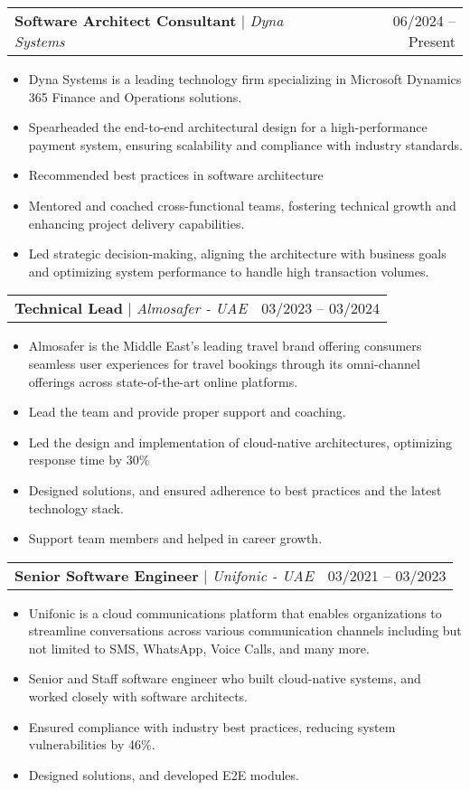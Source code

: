 \documentclass[letterpaper,11pt]{article}
\makeatletter
\newcommand{\resumeItem}[1]{
  \item\small{
    {#1 \vspace{-2pt}}
  }
}
\newcommand{\resumeProjectHeading}[2]{
    \item
    \begin{tabular*}{0.97\textwidth}{l@{\extracolsep{\fill}}r}
      \small#1 & #2 \\
    \end{tabular*}\vspace{-7pt}
}
\newcommand{\resumeItemListStart}{\begin{itemize}}
\newcommand{\resumeItemListEnd}{\end{itemize}\vspace{-5pt}}
\makeatother
\begin{document}
          \resumeProjectHeading
    		  {\textbf{Software Architect Consultant} $|$ \footnotesize\emph{Dyna Systems}\vspace{4pt}}{06/2024 -- Present}
    		  \resumeItemListStart
        		\resumeItem {Dyna Systems is a leading technology firm specializing in Microsoft Dynamics 365 Finance and Operations solutions.}
        		\resumeItem {Spearheaded the end-to-end architectural design for a high-performance payment system, ensuring scalability and compliance with industry standards.}
        		\resumeItem {Recommended best practices in software architecture}
        		\resumeItem {Mentored and coached cross-functional teams, fostering technical growth and enhancing project delivery capabilities.}
        	    \resumeItem {Led strategic decision-making, aligning the architecture with business goals and optimizing system performance to handle high transaction volumes.}
    		 \resumeItemListEnd



          \resumeProjectHeading
	          {\textbf{Technical Lead} $|$ \footnotesize\emph{Almosafer - UAE}\vspace{4pt}}{03/2023 -- 03/2024}
			\resumeItemListStart		  
          			\resumeItem {Almosafer is the Middle East’s leading travel brand offering consumers seamless user experiences for travel bookings through its omni-channel offerings across state-of-the-art online platforms.} 
          			\resumeItem {Lead the team and provide proper support and coaching.}
          			\resumeItem {Led the design and implementation of cloud-native architectures, optimizing response time by 30\%}
          			\resumeItem {Designed solutions, and ensured adherence to best practices and the latest technology stack.}
          			\resumeItem {Support team members and helped in career growth.}
          \resumeItemListEnd 

		 \resumeProjectHeading
          {\textbf{Senior Software Engineer}\vspace{4pt} $|$ \footnotesize\emph{Unifonic - UAE}}{03/2021 -- 03/2023}
		 \resumeItemListStart
 		  	\resumeItem	 {Unifonic is a cloud communications platform that enables organizations to streamline conversations across various communication channels including but not limited to SMS, WhatsApp, Voice Calls, and many more.}         
          	\resumeItem {Senior and Staff software engineer who built cloud-native systems, and worked closely with software architects.}
          	\resumeItem {Ensured compliance with industry best practices, reducing system vulnerabilities by 46\%.}
          	\resumeItem {Designed solutions, and developed E2E modules.}
        \resumeItemListEnd 
         
\end{document}
